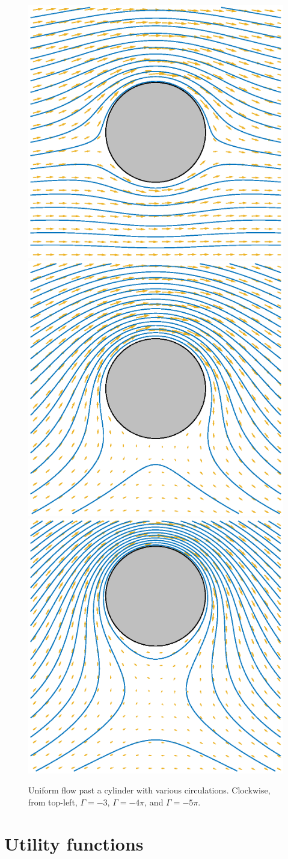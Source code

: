 \documentclass[12pt,fleqn]{article}
\begin{document}
\begin{figure}[htbp]
  \centering
  \includegraphics[width=.46\textwidth]{figures/onecirculate}
  \hspace{.02\textwidth}
  \includegraphics[width=.46\textwidth]{figures/circlebottom}
  \\\vspace*{.02\textwidth}
  \includegraphics[width=.46\textwidth]{figures/offcircle}
  \caption{Uniform flow past a cylinder with various circulations. Clockwise, from top-left, $\Gamma=-3$, $\Gamma=-4\pi$, and $\Gamma=-5\pi$.}
  \label{fig:onecirculate}
\end{figure}

\clearpage
\appendix

\section{Utility functions}
\end{document}
